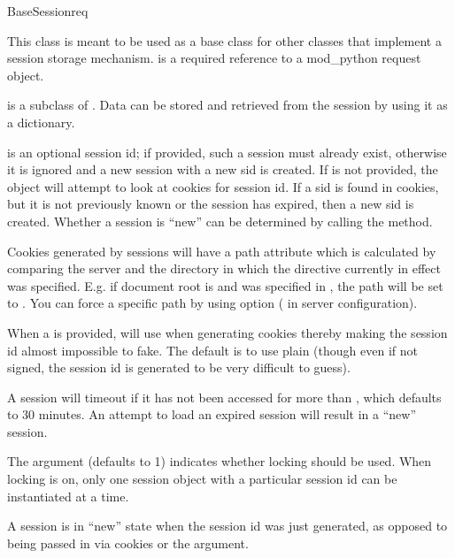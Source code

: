 \begin{classdesc}{BaseSession}{req}

  This class is meant to be used as a base class for other classes
  that implement a session storage mechanism.  is a required
  reference to a mod_python request object.

   is a subclass of . Data can be
  stored and retrieved from the session by using it as a
  dictionary. 

   is an optional session id; if provided, such a session
  must already exist, otherwise it is ignored and a new session with a
  new sid is created. If  is not provided, the object will
  attempt to look at cookies for session id. If a sid is found in
  cookies, but it is not previously known or the session has expired,
  then a new sid is created. Whether a session is ``new'' can be
  determined by calling the  method.

  Cookies generated by sessions will have a path attribute which is
  calculated by comparing the server  and the
  directory in which the  directive currently in
  effect was specified. E.g. if document root is  and
   was specified in , the path
  will be set to . You can force a specific path by using
   option ( in server configuration).

  When a  is provided,  will use
   when generating cookies thereby making the
  session id almost impossible to fake. The default is to use plain
   (though even if not signed, the session id is
  generated to be very difficult to guess).

  A session will timeout if it has not been accessed for more than
  , which defaults to 30 minutes. An attempt to load an
  expired session will result in a ``new'' session.

  The  argument (defaults to 1) indicates whether locking
  should be used. When locking is on, only one session object with a
  particular session id can be instantiated at a time.

  A session is in ``new'' state when the session id was just
  generated, as opposed to being passed in via cookies or the
   argument.



\end{classdesc}
